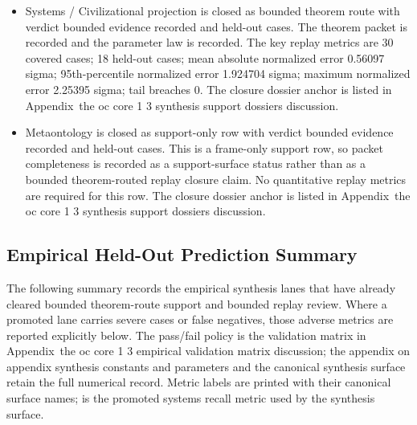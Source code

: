 \begin{itemize}[leftmargin=1.6em,nosep]
\item Systems / Civilizational projection is closed as bounded theorem route with verdict bounded evidence recorded and  held-out cases. The theorem packet is recorded and the parameter law is recorded. The key replay metrics are 30 covered cases; 18 held-out cases; mean absolute normalized error 0.56097 sigma; 95th-percentile normalized error 1.924704 sigma; maximum normalized error 2.25395 sigma; tail breaches 0. The closure dossier anchor is listed in Appendix~the oc core 1 3 synthesis support dossiers discussion.
\item Metaontology is closed as support-only row with verdict bounded evidence recorded and  held-out cases. This is a frame-only support row, so packet completeness is recorded as a support-surface status rather than as a bounded theorem-routed replay closure claim. No quantitative replay metrics are required for this row. The closure dossier anchor is listed in Appendix~the oc core 1 3 synthesis support dossiers discussion.
\end{itemize}

\subsection{Empirical Held-Out Prediction Summary}
The following summary records the empirical synthesis lanes that have already cleared bounded theorem-route support and bounded replay review.
Where a promoted lane carries severe cases or false negatives, those adverse metrics are reported explicitly below. The pass/fail policy is the validation matrix in Appendix~the oc core 1 3 empirical validation matrix discussion; the appendix on appendix synthesis constants and parameters and the canonical synthesis surface retain the full numerical record.
Metric labels are printed with their canonical surface names;  is the promoted systems recall metric used by the synthesis surface.

